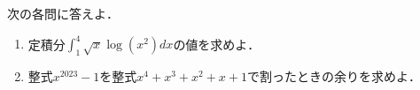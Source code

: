 \documentclass[../../main.tex]{subfiles}
\begin{document}
次の各問に答えよ．
\begin{enumerate}
  \item[問1]定積分$\displaystyle \int_1^4 \sqrt{x} \log (x^2) dx$の値を求めよ．
  \item[問2]整式$x^{2023}-1$を整式$x^4+x^3+x^2+x+1$で割ったときの余りを求めよ．
\end{enumerate}
\end{document}
